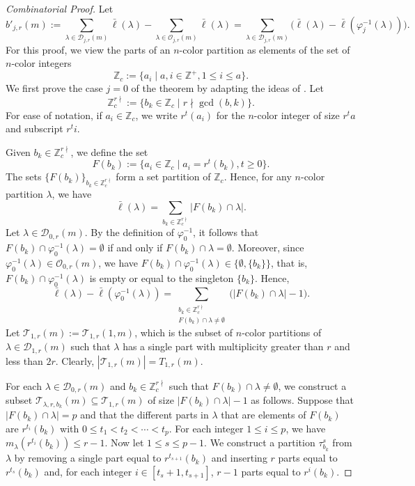 \documentclass[reqno,12pt]{amsart}
\theoremstyle{definition}
\begin{document}
\begin{proof}[Combinatorial Proof] Let $$b'_{j,r}(m):=\sum_{\lambda\in\mathcal{D}_{j,r}(m)}\bar{\ell}(\lambda)-\sum_{\lambda\in\mathcal{O}_{j,r}(m)}\bar{\ell}(\lambda)= \sum_{\lambda\in\mathcal{D}_{j,r}(m)}\Big(\bar{\ell}(\lambda)-\bar{\ell}(\varphi_j^{-1}(\lambda))\Big).$$ For this proof, we view the parts of an $n$-color partition as elements of the set of $n$-color integers 
$$\mathbb Z_c:=\{a_i \mid a, i\in \mathbb Z^+, 1\leq i\leq a\}.$$ 
We first prove the case $j=0$ of the theorem by adapting the ideas of  \cite[Theorem 1.7]{Yang19}. Let $$\mathbb Z_c^{r \nmid}:=\{b_k\in \mathbb Z_c \mid r \nmid \gcd(b,k)\}.$$ For ease of notation, if $a_i\in \mathbb Z_c$, we write $r^t(a_i)$ for the $n$-color integer of size $r^ta$ and subscript $r^ti$. 

Given  $b_k\in \mathbb Z_c^{r \nmid}$, we define the set $$F(b_k):=\{a_i\in \mathbb Z_c \mid a_i=r^t(b_k),  t\geq 0\}.$$ 
The sets $\{F(b_k)\}_{b_k\in \mathbb Z_c^{r \nmid}}$ 
form a set partition of $\mathbb Z_c$. Hence, for any $n$-color partition $\lambda$, we have 
$$\bar\ell(\lambda)=\sum_{b_k\in \mathbb Z_c^{r \nmid}}|F(b_k)\cap \lambda|.$$ 
Let $\lambda\in \mathcal D_{0,r}(m)$. By the definition of $\varphi_0^{-1}$, it follows that $F(b_k)\cap \varphi_0^{-1}(\lambda)=\emptyset$ if and only if $F(b_k)\cap \lambda=\emptyset$. Moreover, since $\varphi_0^{-1}(\lambda)\in \mathcal O_{0,r}(m)$, we have $F(b_k)\cap \varphi_0^{-1}(\lambda)\in \{\emptyset,\{b_k\}\}$, that is, $F(b_k)\cap \varphi_0^{-1}(\lambda)$ is empty or equal to the singleton $\{b_k\}$. Hence, 
$$\bar\ell(\lambda)-\bar\ell(\varphi_0^{-1}(\lambda))=\sum_{\substack{b_k\in \mathbb Z_c^{r \nmid}\\ F(b_k)\cap \lambda\neq \emptyset}}\Big(|F(b_k)\cap \lambda|-1 \Big).$$
Let $\mathcal T_{1,r}(m):=\mathcal T_{1,r}(1,m)$, which is the subset of $n$-color partitions  of  $\lambda \in \mathcal D_{1,r}(m)$  such that $\lambda$ has a single part with multiplicity greater than $r$ and less than $2r$.  Clearly, $|\mathcal T_{1,r}(m)|=T_{1,r}(m)$.

For each $\lambda\in \mathcal D_{0,r}(m)$ and $b_k\in \mathbb Z_c^{r\nmid}$ such that $F(b_k)\cap \lambda\neq\emptyset$, we construct a subset $\mathcal T_{\lambda, r, b_k}(m)\subseteq \mathcal T_{1,r}(m)$ of size $|F(b_k)\cap \lambda|-1$ as follows. Suppose that $|F(b_k)\cap \lambda|=p$ and that the different parts in $\lambda$ that are elements of $F(b_k)$ are $r^{t_i}(b_k)$ with $0\leq t_1<t_2<\cdots < t_p$. For each integer $1\leq i\leq p$, we have $m_\lambda(r^{t_i}(b_k))\leq r-1$.
Now let $1\leq s\leq p-1$. We construct a partition $\tau_{b_k}^s$ from $\lambda$ by removing a single part equal to $r^{t_{s+1}}(b_k)$  and inserting $r$ parts equal to $r^{t_s}(b_k)$ and, for each integer $i\in [t_s+1, t_{s+1}]$, $r-1$ parts equal to $r^{i}(b_k)$.




\end{proof}
\end{document}
